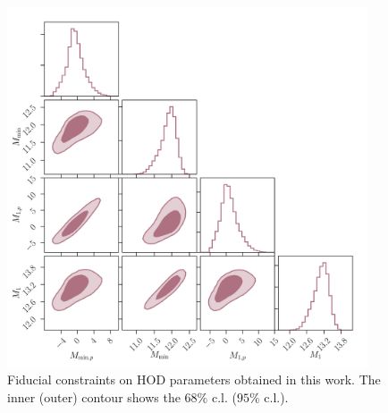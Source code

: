 \documentclass[a4paper,11pt]{article}
\begin{document}
      \begin{figure}
        \begin{center}
          \includegraphics[width=0.95\textwidth]{figures/contours-Mmin-M1_mPk=HOD_fix=alpha-fc-sigmaM_HOD=zevol_fit=pz-shifts+prior=0p2-pz-widths+prior=0p2_fit=auto+cross_cosmo=const_cov=G+NG+SSC-LINBIAS_HOD-param=zfid_clfit=HOD-zevol.pdf}
          \caption{Fiducial constraints on HOD parameters obtained in this work. The inner (outer) contour shows the $68 \%$ c.l. ($95 \%$ c.l.).}
          \label{fig:constraints-fid-hod}
        \end{center}
      \end{figure}
\end{document}
